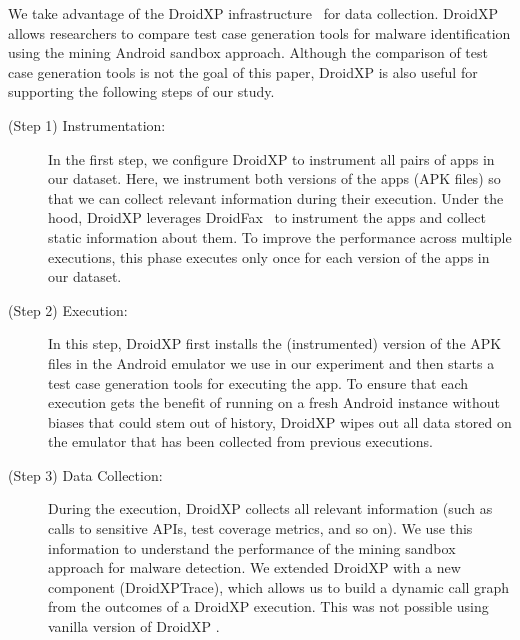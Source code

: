 We take advantage of the DroidXP infrastructure~\cite{DBLP:conf/scam/CostaMCMVBC20}
for data collection. DroidXP allows researchers to compare 
test case generation tools for malware identification using the
mining Android sandbox approach. Although the comparison of test
case generation tools is not the goal of this paper, DroidXP
is also useful for supporting the following steps of our study.

\begin{description}
 \item[(Step 1) Instrumentation:] In the first step,
we configure DroidXP to instrument all pairs of apps in our dataset.
Here, we instrument both versions of the apps (APK files) so that
we can collect relevant information during their execution. Under the hood, DroidXP leverages
DroidFax~\cite{DBLP:conf/icsm/CaiR17a} to instrument the apps and collect static
information about them. To improve the performance across multiple executions,
this phase executes only once for each version of the apps in our dataset.

\item[(Step 2) Execution:] In this step, DroidXP first installs the (instrumented) version of the APK files in the
  Android emulator we use in our experiment and then starts a test case generation tools for executing the app. To ensure
  that each execution gets the benefit of running on a fresh Android instance without biases that could stem out of history,
  DroidXP wipes out all data stored on the emulator that has been collected from previous executions.

\item[(Step 3) Data Collection:] During the execution, DroidXP collects all relevant information (such as calls to sensitive APIs,
  test coverage metrics, and so on). We use this information to understand the performance of the mining sandbox approach for
  malware detection. We extended DroidXP with a new component (DroidXPTrace), which allows us to build a dynamic call graph from the outcomes of a DroidXP execution. This was not possible using vanilla version of DroidXP .
\end{description}


